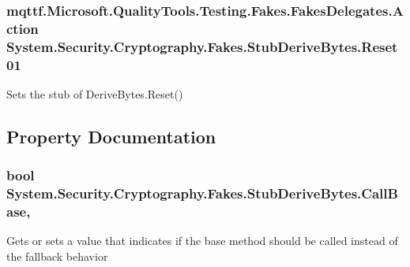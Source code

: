 \hypertarget{class_system_1_1_security_1_1_cryptography_1_1_fakes_1_1_stub_derive_bytes_adaedf40d28ab5befbff297f87c0f19e2}{
\subsubsection[{Reset01}]{\setlength{\rightskip}{0pt plus 5cm}mqttf.\-Microsoft.\-Quality\-Tools.\-Testing.\-Fakes.\-Fakes\-Delegates.\-Action System.\-Security.\-Cryptography.\-Fakes.\-Stub\-Derive\-Bytes.\-Reset01}}\label{class_system_1_1_security_1_1_cryptography_1_1_fakes_1_1_stub_derive_bytes_adaedf40d28ab5befbff297f87c0f19e2}


Sets the stub of Derive\-Bytes.\-Reset()



\subsection{Property Documentation}
\hypertarget{class_system_1_1_security_1_1_cryptography_1_1_fakes_1_1_stub_derive_bytes_a6a660bc17163cd604142d5168f3a208c}{
\subsubsection[{Call\-Base}]{\setlength{\rightskip}{0pt plus 5cm}bool System.\-Security.\-Cryptography.\-Fakes.\-Stub\-Derive\-Bytes.\-Call\-Base\hspace{0.3cm}{\ttfamily [get]}, {\ttfamily [set]}}}\label{class_system_1_1_security_1_1_cryptography_1_1_fakes_1_1_stub_derive_bytes_a6a660bc17163cd604142d5168f3a208c}


Gets or sets a value that indicates if the base method should be called instead of the fallback behavior

